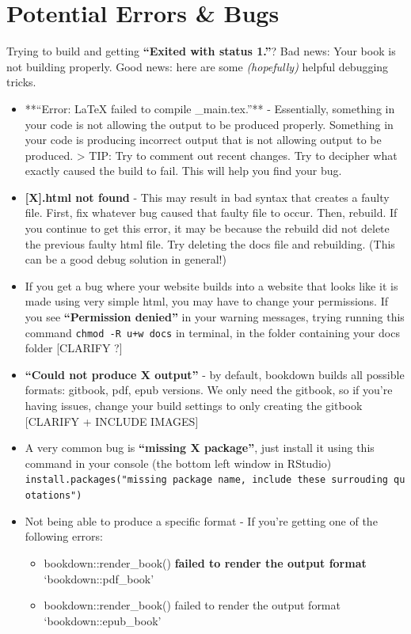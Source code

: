 \documentclass[
]{book}
\providecommand{\tightlist}{%
  \setlength{\itemsep}{0pt}\setlength{\parskip}{0pt}}
\theoremstyle{definition}
\theoremstyle{definition}
\theoremstyle{definition}
\theoremstyle{definition}
\theoremstyle{remark}
\begin{document}
\section{Potential Errors \& Bugs}\label{potential-errors-bugs}

Trying to build and getting \textbf{``Exited with status 1.''}? Bad news: Your book is not building properly. Good news: here are some \emph{(hopefully)} helpful debugging tricks.

\begin{itemize}
\item
  **``Error: LaTeX failed to compile \_main.tex.''** - Essentially, something in your code is not allowing the output to be produced properly. Something in your code is producing incorrect output that is not allowing output to be produced.
  \textgreater{} TIP: Try to comment out recent changes. Try to decipher what exactly caused the build to fail. This will help you find your bug.
\item
  \textbf{{[}X{]}.html not found} - This may result in bad syntax that creates a faulty file. First, fix whatever bug caused that faulty file to occur. Then, rebuild. If you continue to get this error, it may be because the rebuild did not delete the previous faulty html file. Try deleting the docs file and rebuilding. (This can be a good debug solution in general!)
\item
  If you get a bug where your website builds into a website that looks like it is made using very simple html, you may have to change your permissions. If you see \textbf{``Permission denied''} in your warning messages, trying running this command \texttt{chmod\ -R\ u+w\ docs} in terminal, in the folder containing your docs folder {[}CLARIFY ?{]}
\item
  \textbf{``Could not produce X output''} - by default, bookdown builds all possible formats: gitbook, pdf, epub versions. We only need the gitbook, so if you're having issues, change your build settings to only creating the gitbook {[}CLARIFY + INCLUDE IMAGES{]}
\item
  A very common bug is \textbf{``missing X package''}, just install it using this command in your console (the bottom left window in RStudio) \texttt{install.packages("missing\ package\ name,\ include\ these\ surrouding\ quotations")}
\item
  Not being able to produce a specific format - If you're getting one of the following errors:

  \begin{itemize}
  \tightlist
  \item
    bookdown::render\_book() \textbf{failed to render the output format} `bookdown::pdf\_book'
  \item
    bookdown::render\_book() failed to render the output format `bookdown::epub\_book'
  \end{itemize}


\end{itemize}
\end{document}
